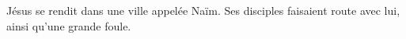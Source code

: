 \encetemps Jésus se rendit dans une ville appelée Naïm.
	Ses disciples faisaient route avec lui, ainsi qu’une grande foule.
